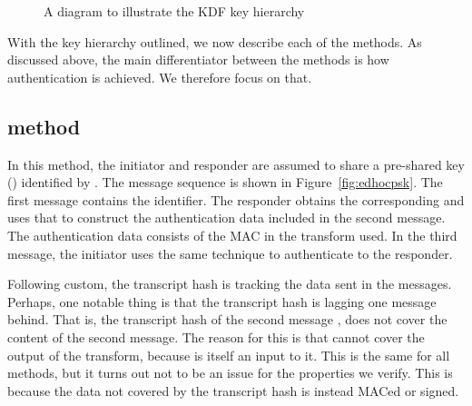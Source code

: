 \begin{figure}[htp]
\centering

\caption{A diagram to illustrate the KDF key hierarchy}
\label{fig:kdfdiagram}
\end{figure}

With the key hierarchy outlined, we now describe each of the \mEdhoc{} methods.
%
As discussed above, the main differentiator between the methods is how
authentication is achieved.
%
We therefore focus on that.
%

\subsection{\mPskPsk{} method}
In this method, the initiator and responder are assumed to share a pre-shared
key (\mPsk) identified by \mIDPsk.
%
The message sequence is shown in Figure~\ref{fig:edhocpsk}.
%
The first message contains the \mIDPsk{} identifier.
%
The responder obtains the corresponding \mPsk{} and uses that to construct the
authentication data included in the second message.
%
The authentication data consists of the MAC in the \mAead{} transform used.
%
In the third message, the initiator uses the same technique to authenticate to
the responder.
%

Following custom, the transcript hash \mTH{} is tracking the data sent in the
messages.
%
Perhaps, one notable thing is that the transcript hash is lagging one message
behind.
%
That is, the transcript hash of the second message \mTHtwo{}, does not cover the
content of the second message.
%
The reason for this is that cannot cover the output of the \mAead{} transform,
because \mTHtwo{} is itself an input to it.
%
This is the same for all methods, but it turns out not to be an issue for the
properties we verify.
%
This is because the data not covered by the transcript hash is instead MACed or
signed.
%

